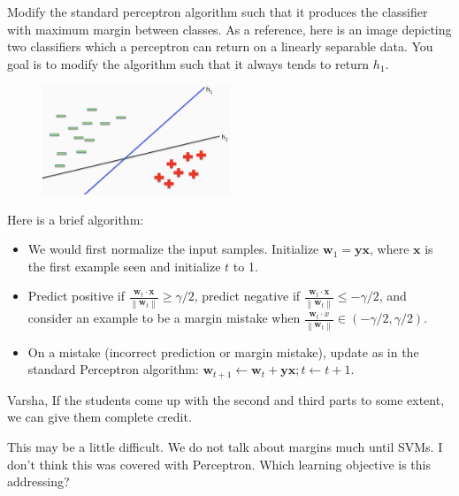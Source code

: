 \begin{parts}
    Modify the standard perceptron algorithm such that it produces the classifier with maximum margin between classes. As a reference, here is an image depicting two classifiers which a perceptron can return on a linearly separable data. You goal is to modify the algorithm such that it always tends to return $h_{1}$.
    \begin{figure}[htbp]
      \centering
      \includegraphics[width=0.5\textwidth]{figures/perceptron_margin}
    \end{figure}
    \fillwithlines{2em}
    \begin{soln}
    Here is a brief algorithm:
    \begin{itemize}
        \item We would first normalize the input samples. Initialize $\mathbf{w}_1=\mathbf{y} \mathbf{x}$, where $\mathbf{x}$ is the first example seen and initialize $t$ to 1.
        \item Predict positive if $\frac{\mathbf{w}_t \cdot \mathbf{x}}{\left\|\mathbf{w}_t\right\|} \geq \gamma / 2$, predict negative if $\frac{\mathbf{w}_t \cdot \mathbf{x}}{\left\|\mathbf{w}_t\right\|} \leq-\gamma / 2$, and consider an example to be a margin mistake when $\frac{\mathbf{w}_t \cdot x}{\left\|\mathbf{w}_t\right\|} \in(-\gamma / 2, \gamma / 2)$.
        \item On a mistake (incorrect prediction or margin mistake), update as in the standard Perceptron algorithm: $\mathbf{w}_{t+1} \leftarrow \mathbf{w}_t+\mathbf{y} \mathbf{x} ; t \leftarrow t+1$.
    \end{itemize}
    \end{soln}   
    \begin{qauthor}
    Varsha, If the students come up with the second and third parts to some extent, we can give them complete credit.
    \end{qauthor}

    \begin{qtester}
   This may be a little difficult. We do not talk about margins much until SVMs. I don't think this was covered with Perceptron. Which learning objective is this addressing?
    \end{qtester}


\end{parts}

